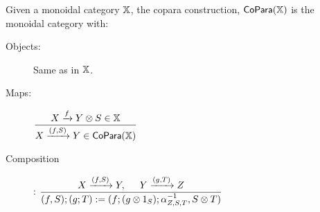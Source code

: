 \begin{definition}
Given a monoidal category $\mathbb{X}$, the copara construction, ${\sf CoPara}(\mathbb{X})$ is the monoidal category with:

\begin{description}
\item[Objects:] Same as in $\mathbb{X}$.

\item[Maps:]  
\hfil $
\dfrac{ X\xrightarrow{f} Y \otimes S \in \mathbb{X}           }
         { X\xrightarrow{(f,S)} Y \in  {\sf CoPara}(\mathbb{X}) }
$

\item[Composition]:  
\hfil $
\dfrac{X\xrightarrow{(f,S)} Y , \hspace*{.5cm} Y\xrightarrow{(g,T)} Z }
         {(f,S);(g;T) := (f;(g\otimes 1_S);\alpha^{-1}_{Z,S,T} ,S\otimes T) } 
$


\end{description}
\end{definition}
